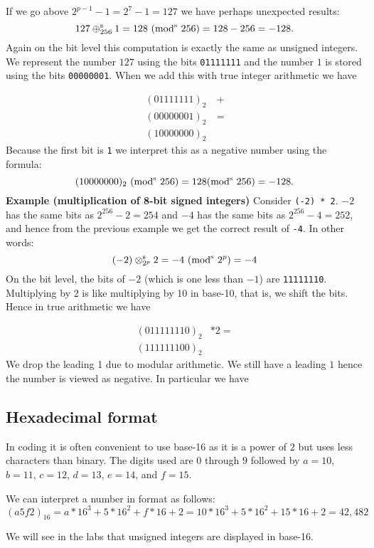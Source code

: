 \begin{example} If we go above $2^{p-1}-1 = 2^7 - 1 = 127$  we have perhaps unexpected results:
\[
127 \ensuremath{\oplus}_{256}^{\rm s} 1 = 128\  ({\rm mod}^{\rm s}\ 256) = 128 - 256 = -128.
\]
Again on the bit level this computation is exactly the same as unsigned integers. We represent the number $127$ using the bits \texttt{01111111} and the  number $1$ is stored using the bits \texttt{00000001}. When we add this with true integer arithmetic we have


\begin{align*}
(01111111)_2 &\ + \\
(00000001)_2 &\ = \\
(10000000)_2&
\end{align*}
Because the first bit is \texttt{1} we interpret this as a negative number using the formula:
\[
(10000000)_2\ ({\rm mod}^{\rm s}\ 256) = 128   ({\rm mod}^{\rm s}\ 256) = -128.
\]
\textbf{Example (multiplication of 8-bit signed integers)} Consider \texttt{(-2) * 2}. $-2$ has the same bits as $2^{256} - 2 = 254$ and $-4$ has the same bits as $2^{256}-4 = 252$, and hence from the previous example we get the correct result of \texttt{-4}. In other words:
\[
(-2) \ensuremath{\otimes}_{2^p}^{\rm s} 2 = -4 \ ({\rm mod}^{\rm s}\ 2^p) = -4
\]
On the bit level, the bits of $-2$ (which is one less than $-1$) are \texttt{11111110}. Multiplying by 2 is like multiplying by 10 in base-10, that is, we shift the bits. Hence in true arithmetic we have


\begin{align*}
(0 11111110)_2 & * 2 = \\
(1 11111100)_2&
\end{align*}
We drop the leading 1 due to modular arithmetic. We still have a leading $1$ hence the number is viewed as negative. In particular we have
\end{example}

\subsection{Hexadecimal format}
In coding it is often convenient to use base-16 as it is a power of $2$ but uses less characters than binary. The digits used are $0$ through $9$ followed by $a = 10$, $b = 11$, $c = 12$, $d = 13$, $e = 14$, and $f = 15$. 

\begin{example} We can interpret a number in format as follows:
\[
(a5f2)_{16} = a*16^3 + 5*16^2 + f*16 + 2 = 
10*16^3 + 5*16^2 + 15*16 + 2 = 42,482
\]
\end{example}

We will see in the labs that unsigned integers are displayed in base-16.



